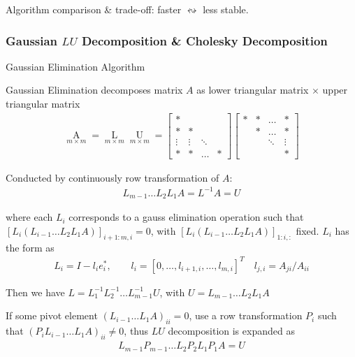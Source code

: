     Algorithm comparison \& trade-off: faster $ \leftrightsquigarrow $ less stable.



\subsubsection{Gaussian $ LU $ Decomposition \& Cholesky Decomposition}
\begin{point}
    Gaussian Elimination Algorithm
\end{point}

    Gaussian Elimination decomposes matrix $ A $ as lower triangular matrix $ \times $ upper triangular matrix
    \begin{align}
        \mathop{A}\limits_{m\times m}=\mathop{L}\limits_{m\times m}\mathop{U}\limits_{m\times m}  =
        \begin{bmatrix}
            *&&&\\
            *&*&&\\
            \vdots&\vdots&\ddots&\\
            *&*&\ldots&*
        \end{bmatrix}
        \begin{bmatrix}
            *&*&\ldots &*\\
            &*&\ldots&*\\
            &&\ddots&\vdots\\
            &&&*
        \end{bmatrix}  
    \end{align}
    
    Conducted by continuously row transformation of $ A $:
    \begin{align}
        L_{m-1}\ldots L_2L_1A=L^{-1}A=U 
    \end{align}
    
    where each $ L_i $ corresponds to a gauss elimination operation such that $ \left[L_i(L_{i-1}\ldots L_2L_1A)\right]_{i+1:m,i}=0 $, with $\left[L_i(L_{i-1}\ldots L_2L_1A)\right]_{1:i,:} $ fixed. $ L_i $ has the form as 
    \begin{align}
        L_i=I-l_ie_i^*,\qquad l_i=[0,\ldots,l_{i+1,i},\ldots,l_{m,i}]^T\quad l_{j,i}=A_{ji}/A_{ii}
    \end{align}
    
    Then we have $ L=L_1^{-1}L_2^{-1}\ldots L_{m-1}^{-1}U $, with $ U=L_{m-1}\ldots L_2L_1A $

    If some pivot element $ (L_{i-1}\ldots L_1A)_{ii}=0 $, use a row transformation $ P_i $ such that $ (P_iL_{i-1}\ldots L_1A)_{ii}\neq 0 $, thus $ LU $ decomposition is expanded as 
    \begin{align}
        L_{m-1}P_{m-1}\ldots L_2P_2L_1P_1A=U
    \end{align}

